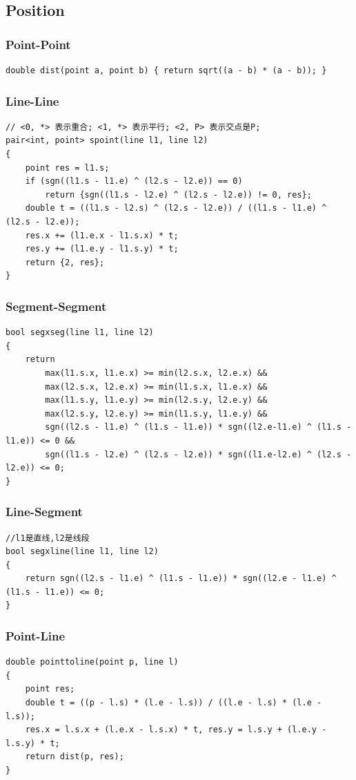\documentclass[twoside]{article}
\begin{document}
\subsection{Position}
\subsubsection{Point-Point}
\begin{lstlisting}
double dist(point a, point b) { return sqrt((a - b) * (a - b)); }
\end{lstlisting}
\subsubsection{Line-Line}
\begin{lstlisting}
// <0, *> 表示重合; <1, *> 表示平行; <2, P> 表示交点是P;
pair<int, point> spoint(line l1, line l2)
{
    point res = l1.s;
    if (sgn((l1.s - l1.e) ^ (l2.s - l2.e)) == 0)
        return {sgn((l1.s - l2.e) ^ (l2.s - l2.e)) != 0, res};
    double t = ((l1.s - l2.s) ^ (l2.s - l2.e)) / ((l1.s - l1.e) ^ (l2.s - l2.e));
    res.x += (l1.e.x - l1.s.x) * t;
    res.y += (l1.e.y - l1.s.y) * t;
    return {2, res};
}
\end{lstlisting}
\subsubsection{Segment-Segment}
\begin{lstlisting}
bool segxseg(line l1, line l2)
{
    return
        max(l1.s.x, l1.e.x) >= min(l2.s.x, l2.e.x) &&
        max(l2.s.x, l2.e.x) >= min(l1.s.x, l1.e.x) &&
        max(l1.s.y, l1.e.y) >= min(l2.s.y, l2.e.y) &&
        max(l2.s.y, l2.e.y) >= min(l1.s.y, l1.e.y) &&
        sgn((l2.s - l1.e) ^ (l1.s - l1.e)) * sgn((l2.e-l1.e) ^ (l1.s - l1.e)) <= 0 &&
        sgn((l1.s - l2.e) ^ (l2.s - l2.e)) * sgn((l1.e-l2.e) ^ (l2.s - l2.e)) <= 0;
}
\end{lstlisting}
\subsubsection{Line-Segment}
\begin{lstlisting}
//l1是直线,l2是线段
bool segxline(line l1, line l2)
{
    return sgn((l2.s - l1.e) ^ (l1.s - l1.e)) * sgn((l2.e - l1.e) ^ (l1.s - l1.e)) <= 0;
}
\end{lstlisting}
\subsubsection{Point-Line}
\begin{lstlisting}
double pointtoline(point p, line l)
{
    point res;
    double t = ((p - l.s) * (l.e - l.s)) / ((l.e - l.s) * (l.e - l.s));
    res.x = l.s.x + (l.e.x - l.s.x) * t, res.y = l.s.y + (l.e.y - l.s.y) * t;
    return dist(p, res);
}
\end{lstlisting}
\end{document}
